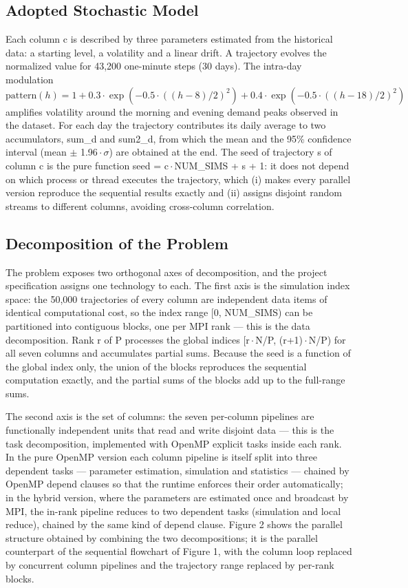 \documentclass[12pt,a4paper]{article}
\begin{document}
\subsection{Adopted Stochastic Model}

Each column c is described by three parameters estimated from the
historical data: a starting level, a volatility and a linear drift. A
trajectory evolves the normalized value for 43,200 one-minute steps (30
days). The intra-day modulation $\text{pattern}(h) = 1 +
0.3\cdot\exp(-0.5\cdot((h-8)/2)^2) + 0.4\cdot\exp(-0.5\cdot((h-18)/2)^2)$ amplifies
volatility around the morning and evening demand peaks observed in the
dataset. For each day the trajectory contributes its daily average to
two accumulators, sum\_d and sum2\_d, from which the mean and the 95\%
confidence interval (mean $\pm$ 1.96\,$\cdot$\,$\sigma$) are obtained at the end. The seed of
trajectory s of column c is the pure function seed = c\,$\cdot$\,NUM\_SIMS + s +
1: it does not depend on which process or thread executes the
trajectory, which (i) makes every parallel version reproduce the sequential results exactly and (ii)
assigns disjoint random streams to different columns, avoiding
cross-column correlation.

\subsection{Decomposition of the Problem}

The problem exposes two orthogonal axes of decomposition, and the
project specification assigns one technology to each. The first axis is
the simulation index space: the 50,000 trajectories of every column are
independent data items of identical computational cost, so the index
range [0, NUM\_SIMS) can be partitioned into contiguous blocks, one
per MPI rank --- this is the data decomposition. Rank r of P processes
the global indices [r\,$\cdot$\,N/P, (r+1)\,$\cdot$\,N/P) for all seven columns and
accumulates partial sums. Because the seed is a function of the global
index only, the union of the blocks reproduces the sequential
computation exactly, and the partial sums of the blocks add up to the
full-range sums.

The second axis is the set of columns: the seven per-column pipelines
are functionally independent units that read and write disjoint data ---
this is the task decomposition, implemented with OpenMP explicit tasks
inside each rank. In the pure OpenMP version each column pipeline is
itself split into three dependent tasks --- parameter estimation,
simulation and statistics --- chained by OpenMP depend clauses so that
the runtime enforces their order automatically; in the hybrid version,
where the parameters are estimated once and broadcast by MPI, the
in-rank pipeline reduces to two dependent tasks (simulation and local
reduce), chained by the same kind of depend clause. Figure 2 shows the
parallel structure obtained by combining the two decompositions; it is
the parallel counterpart of the sequential flowchart of Figure 1, with
the column loop replaced by concurrent column pipelines and the
trajectory range replaced by per-rank blocks.
\end{document}
